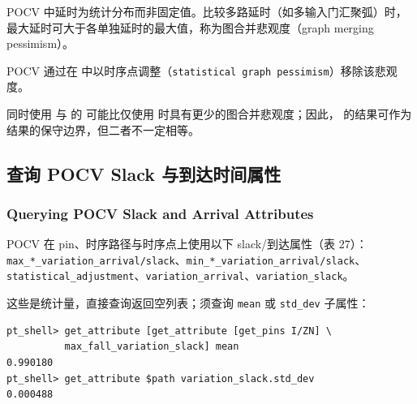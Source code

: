 POCV 中延时为统计分布而非固定值。比较多路延时（如多输入门汇聚弧）时，最大延时可大于各单独延时的最大值，称为图合并悲观度（graph merging pessimism）。

POCV 通过在  中以时序点调整（\texttt{statistical graph pessimism}）移除该悲观度。

\begin{noteBox}
同时使用  与  的  可能比仅使用  时具有更少的图合并悲观度；因此， 的结果可作为  结果的保守边界，但二者不一定相等。
\end{noteBox}

\subsection{查询 POCV Slack 与到达时间属性}
\subsubsection*{Querying POCV Slack and Arrival Attributes}

POCV 在 pin、时序路径与时序点上使用以下 slack/到达属性（表 27）：\texttt{max\_*\_variation\_arrival/slack}、\texttt{min\_*\_variation\_arrival/slack}、\texttt{statistical\_adjustment}、\texttt{variation\_arrival}、\texttt{variation\_slack}。

这些是统计量，直接查询返回空列表；须查询 \texttt{mean} 或 \texttt{std\_dev} 子属性：
\begin{lstlisting}
pt_shell> get_attribute [get_attribute [get_pins I/ZN] \
          max_fall_variation_slack] mean
0.990180
pt_shell> get_attribute $path variation_slack.std_dev
0.000488
\end{lstlisting}

